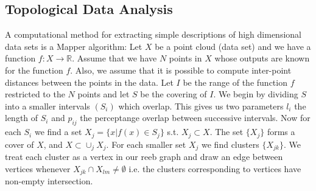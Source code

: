 \documentclass[]{article}
\newcommand{\R}{\mathbb{R}}
\begin{document}
\subsection{Topological Data Analysis}
A computational method for extracting simple descriptions of high dimensional data sets is a Mapper algorithm:
Let $X$ be a point cloud (data set) and we have a function $f:X \to \R$.
Assume that we have $N$ points in $X$ whose outputs are known for the function $f$.
Also, we assume that it is possible to compute inter-point distances between the points in the data.
Let $I$ be the range of the function $f$ restricted to the $N$ points and let $S$ be the covering of $I$.
We begin by dividing $S$ into a smaller intervals $(S_i)$ which overlap.
This gives us two parameters $l_i$ the length of $S_i$ and $p_{ij}$ the perceptange overlap between successive intervals.
Now for each $S_i$ we find a set $X_j = \{x | f(x) \in S_j\}$ s.t. $X_j \subset X$. The set $\{X_j\}$ forms a cover of $X$, and $X \subset \cup_j X_j$.
For each smaller set $X_j$ we find clusters $\{X_{jk}\} $.
We treat each cluster as a vertex in our reeb graph and draw an edge between vertices whenever $X_{jk} \cap X_{lm} \neq \emptyset$ i.e. the clusters corresponding to vertices have non-empty intersection. \\
\end{document}
